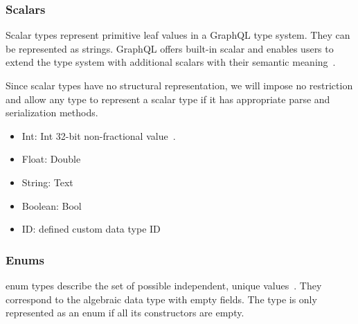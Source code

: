 \begin{frame}\frametitle{Scalars}

Scalar types represent primitive leaf values in a GraphQL type system. They can be represented as strings. GraphQL offers built-in scalar and enables users to extend the type system with additional scalars with their semantic meaning~\cite{gql-spec}.

Since scalar types have no structural representation, we will impose no restriction and allow any type to represent a scalar type if it has appropriate parse and serialization methods.

\begin{itemize}

  \item Int: Int
    32-bit non-fractional value~\cite{gql-spec}. 

  \item Float: Double

  \item String: Text
  \item Boolean: Bool
  \item ID:  defined custom data type ID 
\end{itemize}

\end{frame}

\begin{frame}\frametitle{Enums}

enum types describe the set of possible independent, unique values~\cite{gql-spec}. They correspond to the algebraic data type with empty fields. The type is only represented as an enum if all its constructors are empty.


\end{frame}

